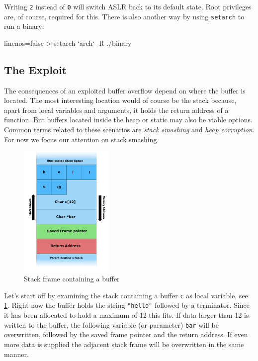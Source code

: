 \documentclass[article]{uibk}
\begin{document}
Writing \texttt{2} instead of \texttt{0} will switch ASLR back to its default
state. Root privileges are, of course, required for this. There is also another
way by using \texttt{setarch} to run a binary:

\begin{code*}{linenos=false}
    > setarch `arch` -R ./binary
\end{code*}

\subsection{The Exploit}

The consequences of an exploited buffer overflow depend on where the buffer is
located. The most interesting location would of course be the stack because,
apart from local variables and arguments, it holds the return address of a
function. But buffers located inside the heap or static may also be viable
options. Common terms related to these scenarios are \textit{stack smashing}
and \textit{heap corruption}. For now we focus our attention on stack smashing.

\begin{figure}[H]
    \centering
    \includegraphics[width=0.4\textwidth]{gfx/stack_smash.png}
    \caption{Stack frame containing a buffer}
    \label{fig:stack_frame}
\end{figure}

Let's start off by examining the stack containing a buffer \texttt{c} as local
variable, see \cref{fig:stack_frame}. Right now the buffer holds the string
\texttt{"hello"} followed by a terminator. Since it has been allocated to hold
a maximum of \SI{12}{\byte} this fits. If data larger than \SI{12}{\byte} is
written to the buffer, the following variable (or parameter) \texttt{bar} will
be overwritten, followed by the saved frame pointer and the return address. If
even more data is supplied the adjacent stack frame will be overwritten in the
same manner.
\end{document}
